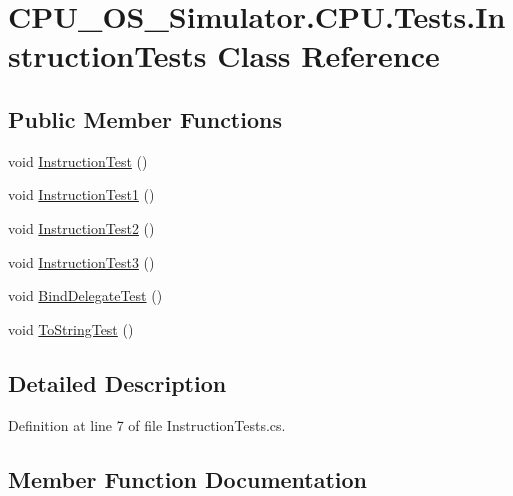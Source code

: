 \hypertarget{class_c_p_u___o_s___simulator_1_1_c_p_u_1_1_tests_1_1_instruction_tests}{}\section{C\+P\+U\+\_\+\+O\+S\+\_\+\+Simulator.\+C\+P\+U.\+Tests.\+Instruction\+Tests Class Reference}
\label{class_c_p_u___o_s___simulator_1_1_c_p_u_1_1_tests_1_1_instruction_tests}
\subsection*{Public Member Functions}
\begin{DoxyCompactItemize}
\item 
void \hyperlink{class_c_p_u___o_s___simulator_1_1_c_p_u_1_1_tests_1_1_instruction_tests_a1305b71dfc46b89f314713c65bac2e7c}{Instruction\+Test} ()
\item 
void \hyperlink{class_c_p_u___o_s___simulator_1_1_c_p_u_1_1_tests_1_1_instruction_tests_abc74bfc3bc7d34eba9e033327a642e96}{Instruction\+Test1} ()
\item 
void \hyperlink{class_c_p_u___o_s___simulator_1_1_c_p_u_1_1_tests_1_1_instruction_tests_a4fd3d1dfc697b33ea1a2b415f7c45119}{Instruction\+Test2} ()
\item 
void \hyperlink{class_c_p_u___o_s___simulator_1_1_c_p_u_1_1_tests_1_1_instruction_tests_a5ed7093663951b67219cc7669295d2d1}{Instruction\+Test3} ()
\item 
void \hyperlink{class_c_p_u___o_s___simulator_1_1_c_p_u_1_1_tests_1_1_instruction_tests_a08e3bc0d16c5a749657986cfb06d7544}{Bind\+Delegate\+Test} ()
\item 
void \hyperlink{class_c_p_u___o_s___simulator_1_1_c_p_u_1_1_tests_1_1_instruction_tests_a4966086b23824a6795e3325ab747eeba}{To\+String\+Test} ()
\end{DoxyCompactItemize}


\subsection{Detailed Description}


Definition at line 7 of file Instruction\+Tests.\+cs.



\subsection{Member Function Documentation}
\hypertarget{class_c_p_u___o_s___simulator_1_1_c_p_u_1_1_tests_1_1_instruction_tests_a08e3bc0d16c5a749657986cfb06d7544}{}
